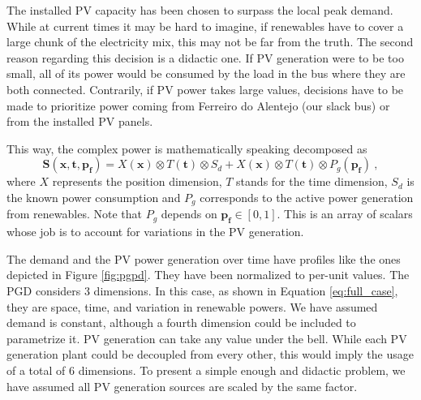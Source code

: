 The installed PV capacity has been chosen to surpass the local peak demand. While at current times it may be hard to imagine, if renewables have to cover a large chunk of the electricity mix, this may not be far from the truth. The second reason regarding this decision is a didactic one. If PV generation were to be too small, all of its power would be consumed by the load in the bus where they are both connected. Contrarily, if PV power takes large values, decisions have to be made to prioritize power coming from Ferreiro do Alentejo (our slack bus) or from the installed PV panels. 

This way, the complex power is mathematically speaking decomposed as
\begin{equation}
	\bm{S} (\bm{x},\bm{t},\bm{p_f}) = X(\bm{x})\otimes T(\bm{t})\otimes S_d + X(\bm{x})\otimes T(\bm{t})\otimes P_g(\bm{p_f}) \ ,
\label{eq:full_case}
\end{equation}
where $X$ represents the position dimension, $T$ stands for the time dimension, $S_d$ is the known power consumption and $P_g$ corresponds to the active power generation from renewables. Note that $P_g$ depends on $\bm{p_f} \in [0,1]$. This is an array of scalars whose job is to account for variations in the PV generation. 

The demand and the PV power generation over time have profiles like the ones depicted in Figure \ref{fig:pgpd}. They have been normalized to per-unit values. The PGD considers 3 dimensions. In this case, as shown in Equation \ref{eq:full_case}, they are space, time, and variation in renewable powers. We have assumed demand is constant, although a fourth dimension could be included to parametrize it. PV generation can take any value under the bell. While each PV generation plant could be decoupled from every other, this would imply the usage of a total of 6 dimensions. To present a simple enough and didactic problem, we have assumed all PV generation sources are scaled by the same factor. 

